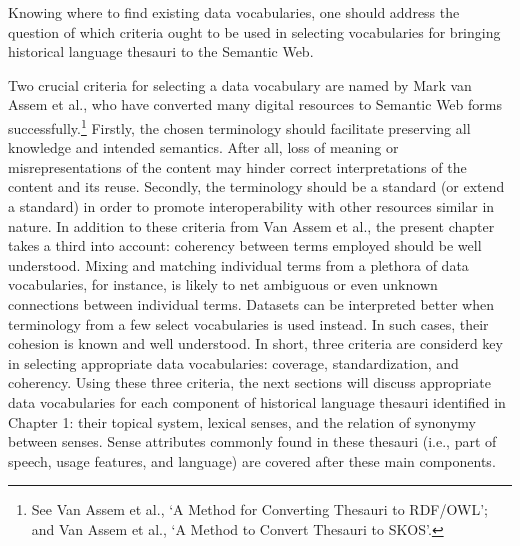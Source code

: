 Knowing where to find existing data vocabularies, one should address the question of which criteria ought to be used in selecting vocabularies for bringing historical language thesauri to the Semantic Web.

Two crucial criteria for selecting a data vocabulary are named by Mark van Assem et al., who have converted many digital resources to Semantic Web forms successfully.\footnote{See Van Assem et al., `A Method for Converting Thesauri to RDF/OWL'; and Van Assem et al., `A Method to Convert Thesauri to SKOS'.} Firstly, the chosen terminology should facilitate preserving all knowledge and intended semantics. After all, loss of meaning or misrepresentations of the content may hinder correct interpretations of the content and its reuse. Secondly, the terminology should be a standard (or extend a standard) in order to promote interoperability with other resources similar in nature. In addition to these criteria from Van Assem et al., the present chapter takes a third into account: coherency between terms employed should be well understood. Mixing and matching individual terms from a plethora of data vocabularies, for instance, is likely to net ambiguous or even unknown connections between individual terms. Datasets can be interpreted better when terminology from a few select vocabularies is used instead. In such cases, their cohesion is known and well understood. In short, three criteria are considerd key in selecting appropriate data vocabularies: coverage, standardization, and coherency. Using these three criteria, the next sections will discuss appropriate data vocabularies for each component of historical language thesauri identified in Chapter 1: their topical system, lexical senses, and the relation of synonymy between senses. Sense attributes commonly found in these thesauri (i.e., part of speech, usage features, and language) are covered after these main components.

